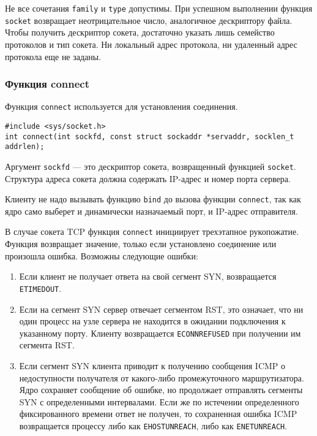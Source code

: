Не все сочетания \lstinline{family} и \lstinline{type} допустимы. При успешном выполнении функция \lstinline{socket} возвращает неотрицательное число, аналогичное дескриптору файла. Чтобы получить дескриптор сокета, достаточно указать лишь семейство протоколов и тип сокета. Ни локальный адрес протокола, ни удаленный адрес протокола еще не заданы.

\subsubsection{Функция connect}
Функция \lstinline{connect} используется для установления соединения.
\lstset{language=C,caption=}
\begin{lstlisting}
#include <sys/socket.h>
int connect(int sockfd, const struct sockaddr *servaddr, socklen_t addrlen);
\end{lstlisting}

Аргумент \lstinline{sockfd} --- это дескриптор сокета, возвращенный функцией \lstinline{socket}. Структура адреса сокета должна содержать IP-адрес и номер порта сервера.

Клиенту не надо вызывать функцию \lstinline{bind} до вызова функции \lstinline{connect}, так как ядро само выберет и динамически назначаемый порт, и IP-адрес отправителя.

В случае сокета TCP функция \lstinline{connect} инициирует трехэтапное рукопожатие. Функция возвращает значение, только если установлено соединение или произошла ошибка. Возможны следующие ошибки:
\begin{enumerate}
  \item Если клиент не получает ответа на свой сегмент SYN, возвращается \lstinline{ETIMEDOUT}.
  \item Если на сегмент SYN сервер отвечает сегментом RST, это означает, что ни один процесс на узле сервера не находится в ожидании подключения к указанному порту. Клиенту возвращается \lstinline{ECONNREFUSED} при получении им сегмента RST.
  \item Если сегмент SYN клиента приводит к получению сообщения ICMP о недоступности получателя от какого-либо промежуточного маршрутизатора. Ядро сохраняет сообщение об ошибке, но продолжает отправлять сегменты SYN с определенными интервалами. Если же по истечении определенного фиксированного времени ответ не получен, то сохраненная ошибка ICMP возвращается процессу либо как \lstinline{EHOSTUNREACH}, либо как \lstinline{ENETUNREACH}.
\end{enumerate}

